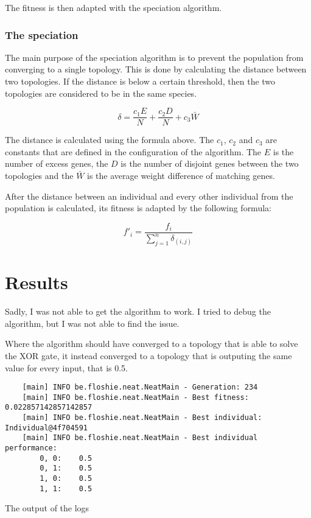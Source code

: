\documentclass[a4paper, 12pt]{article}
\begin{document}
The fitness is then adapted with the speciation algorithm.

\subsubsection*{The speciation}

The main purpose of the speciation algorithm is to prevent the population from converging to a single topology. This is done by calculating the distance between two topologies. If the distance is below a certain threshold, then the two topologies are considered to be in the same species.

\begin{equation}
    \delta = \frac{c_1 E}{N} + \frac{c_2 D}{N} + c_3 \bar{W}
\end{equation}

The distance is calculated using the formula above. The $c_1$, $c_2$ and $c_3$ are constants that are defined in the configuration of the algorithm. The $E$ is the number of excess genes, the $D$ is the number of disjoint genes between the two topologies and the $\bar{W}$ is the average weight difference of matching genes.

After the distance between an individual and every other individual from the population is calculated, its fitness is adapted by the following formula:

\begin{equation}
    f'_i = \frac{f_i}{\sum_{j=1}^{n} \delta_{(i, j)}}
\end{equation}

\section{Results}

Sadly, I was not able to get the algorithm to work. I tried to debug the algorithm, but I was not able to find the issue.

Where the algorithm should have converged to a topology that is able to solve the XOR gate, it instead converged to a topology that is outputing the same value for every input, that is 0.5.

\begin{listing}[H]
    \centering
    \begin{verbatim}
    [main] INFO be.floshie.neat.NeatMain - Generation: 234
    [main] INFO be.floshie.neat.NeatMain - Best fitness: 0.022857142857142857
    [main] INFO be.floshie.neat.NeatMain - Best individual: Individual@4f704591
    [main] INFO be.floshie.neat.NeatMain - Best individual performance:
        0, 0:    0.5
        0, 1:    0.5
        1, 0:    0.5
        1, 1:    0.5
    \end{verbatim}
    \caption{The output of the logs}
    \label{lst:logs}
\end{listing}
\end{document}
